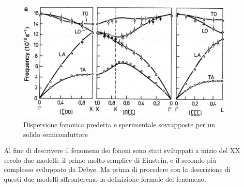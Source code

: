\documentclass[oneside]{amsbook}
\numberwithin{section}{chapter}
\numberwithin{equation}{section}
\numberwithin{figure}{section}
\begin{document}
\begin{figure}[H]
\centering
\caption{Dispersione fononica predetta e sperimentale sovrapposte per un solido semiconduttore}\label{fonodisp}
\includegraphics[scale=0.2]{fonodisp}
\end{figure}
Al fine di descrivere il fenomeno dei fononi sono stati sviluppati a inizio del XX secolo due modelli: il primo molto semplice di Einstein, e il secondo più complesso sviluppato da Debye. Ma prima di procedere con la descrizione di questi due modelli affronteremo la definizione formale del fenomeno.
\end{document}
